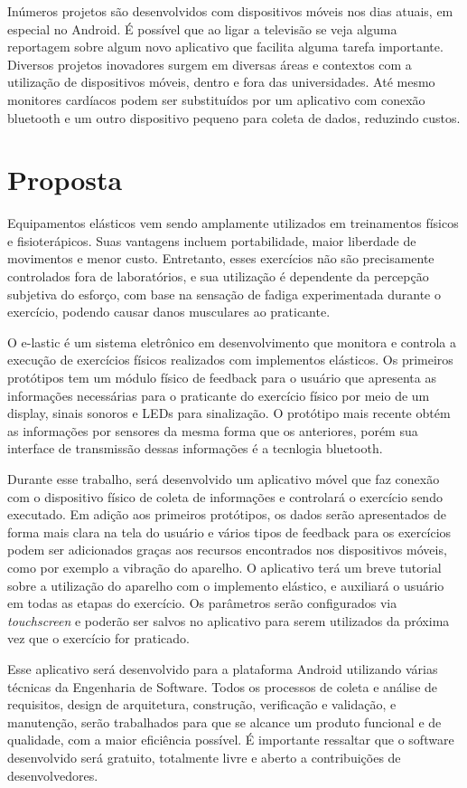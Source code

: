 Inúmeros projetos são desenvolvidos com dispositivos móveis nos dias atuais, em especial no Android. É possível que ao ligar a televisão se veja alguma reportagem sobre algum novo aplicativo que facilita alguma tarefa importante. Diversos projetos inovadores surgem em diversas áreas e contextos com a utilização de dispositivos móveis, dentro e fora das universidades. Até mesmo monitores cardíacos podem ser substituídos por um aplicativo com conexão bluetooth e um outro dispositivo pequeno para coleta de dados, reduzindo custos.
\section{Proposta}
Equipamentos elásticos vem sendo amplamente utilizados em treinamentos físicos e fisioterápicos. Suas vantagens incluem portabilidade, maior liberdade de movimentos e menor custo. Entretanto, esses exercícios não são precisamente controlados fora de laboratórios, e sua utilização é dependente da percepção subjetiva do esforço, com base na sensação de fadiga experimentada durante o exercício, podendo causar danos musculares ao praticante.

O e-lastic é um sistema eletrônico em desenvolvimento que monitora e controla a execução de exercícios físicos realizados com implementos elásticos. Os primeiros protótipos tem um módulo físico de feedback para o usuário que apresenta as informações necessárias para o praticante do exercício físico por meio de um display, sinais sonoros e LEDs para sinalização. O protótipo mais recente obtém as informações por sensores da mesma forma que os anteriores, porém sua interface de transmissão dessas informações é a tecnlogia bluetooth.

Durante esse trabalho, será desenvolvido um aplicativo móvel que faz conexão com o dispositivo físico de coleta de informações e controlará o exercício sendo executado. Em adição aos primeiros protótipos, os dados serão apresentados de forma mais clara na tela do usuário e vários tipos de feedback para os exercícios podem ser adicionados graças aos recursos encontrados nos dispositivos móveis, como por exemplo a vibração do aparelho. O aplicativo terá um breve tutorial sobre a utilização do aparelho com o implemento elástico, e auxiliará o usuário em todas as etapas do exercício. Os parâmetros serão configurados via \textit{touchscreen} e poderão ser salvos no aplicativo para serem utilizados da próxima vez que o exercício for praticado.

Esse aplicativo será desenvolvido para a plataforma Android utilizando várias técnicas da Engenharia de Software. Todos os processos de coleta e análise de requisitos, design de arquitetura, construção, verificação e validação, e manutenção, serão trabalhados para que se alcance um produto funcional e de qualidade, com a maior eficiência possível. É importante ressaltar que o software desenvolvido será gratuito, totalmente livre e aberto a contribuições de desenvolvedores.
